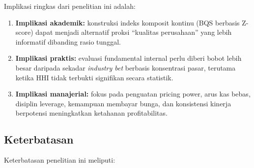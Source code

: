 \documentclass[12pt,a4paper]{article}
\providecommand{\tightlist}{%
  \setlength{\itemsep}{0pt}\setlength{\parskip}{0pt}%
}
\begin{document}
Implikasi ringkas dari penelitian ini adalah:

\begin{enumerate}
\def\labelenumi{\arabic{enumi}.}
\tightlist
\item
  \textbf{Implikasi akademik:} konstruksi indeks komposit kontinu (BQS
  berbasis Z-score) dapat menjadi alternatif proksi ``kualitas
  perusahaan'' yang lebih informatif dibanding rasio tunggal.
\item
  \textbf{Implikasi praktis:} evaluasi fundamental internal perlu diberi
  bobot lebih besar daripada sekadar \emph{industry bet} berbasis
  konsentrasi pasar, terutama ketika HHI tidak terbukti signifikan
  secara statistik.
\item
  \textbf{Implikasi manajerial:} fokus pada penguatan pricing power,
  arus kas bebas, disiplin leverage, kemampuan membayar bunga, dan
  konsistensi kinerja berpotensi meningkatkan ketahanan profitabilitas.
\end{enumerate}

\subsection{Keterbatasan}\label{keterbatasan}

Keterbatasan penelitian ini meliputi:
\end{document}
